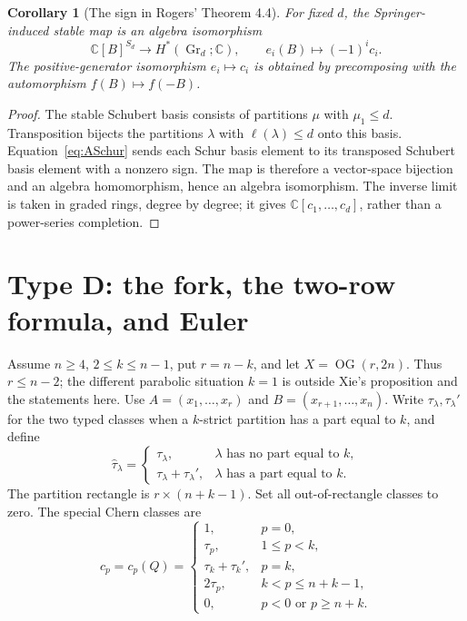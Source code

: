 \documentclass[11pt,letterpaper]{article}
\newtheorem{corollary}[theorem]{Corollary}
\theoremstyle{remark}
\newcommand{\OG}{\operatorname{OG}}
\newcommand{\Gr}{\operatorname{Gr}}
\newcommand{\wtau}{\widehat{\tau}}
\newcommand{\C}{\mathbb C}
\begin{document}
\begin{corollary}[The sign in Rogers' Theorem 4.4]\label{cor:Astable}
For fixed $d$, the Springer-induced stable map is an algebra isomorphism
\[
 \C[B]^{S_d}\longrightarrow H^*(\Gr_d;\C),\qquad
 e_i(B)\longmapsto(-1)^i c_i.
\]
The positive-generator isomorphism $e_i\mapsto c_i$ is obtained by precomposing with the automorphism $f(B)\mapsto f(-B)$.
\end{corollary}
\begin{proof}
The stable Schubert basis consists of partitions $\mu$ with $\mu_1\leq d$. Transposition bijects the partitions $\lambda$ with $\ell(\lambda)\leq d$ onto this basis. Equation~\eqref{eq:ASchur} sends each Schur basis element to its transposed Schubert basis element with a nonzero sign. The map is therefore a vector-space bijection and an algebra homomorphism, hence an algebra isomorphism. The inverse limit is taken in graded rings, degree by degree; it gives $\C[c_1,\ldots,c_d]$, rather than a power-series completion.
\end{proof}

\section{Type D: the fork, the two-row formula, and Euler}
\label{sec:D}

Assume $n\geq4$, $2\leq k\leq n-1$, put $r=n-k$, and let $X=\OG(r,2n)$. Thus $r\leq n-2$; the different parabolic situation $k=1$ is outside Xie's proposition and the statements here. Use $A=(x_1,\ldots,x_r)$ and $B=(x_{r+1},\ldots,x_n)$. Write $\tau_\lambda,\tau_\lambda'$ for the two typed classes when a $k$-strict partition has a part equal to $k$, and define
\[
 \wtau_\lambda=
 \begin{cases}
 \tau_\lambda,&\lambda\text{ has no part equal to }k,\\
 \tau_\lambda+\tau_\lambda',&\lambda\text{ has a part equal to }k.
 \end{cases}
\]
The partition rectangle is $r\times(n+k-1)$. Set all out-of-rectangle classes to zero. The special Chern classes are
\begin{equation}
 c_p=c_p(Q)=
 \begin{cases}
 1,&p=0,\\
 \tau_p,&1\leq p<k,\\
 \tau_k+\tau_k',&p=k,\\
 2\tau_p,&k<p\leq n+k-1,\\
 0,&p<0\text{ or }p\geq n+k.
 \end{cases}
 \label{eq:Dspecial}
\end{equation}
\end{document}
